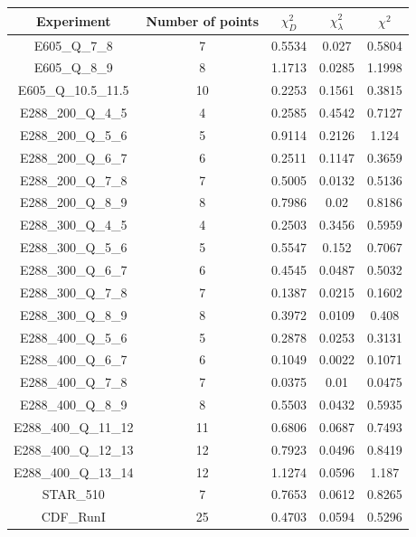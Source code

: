\documentclass[
]{article}
\begin{document}
\begin{table}[h]

\centering

\begin{tabular}{|c|c|c|c|c|} \hline

\textbf{Experiment} & \textbf{Number of
points} & \textbf{\(\chi_{D}^2\)} & \textbf{\(\chi_{\lambda}^2\)} & \textbf{\(\chi^2\)} \\ \hline

E605\_Q\_7\_8 & 7 & 0.5534 & 0.027 & 0.5804 \\ \hline
E605\_Q\_8\_9 & 8 & 1.1713 & 0.0285 & 1.1998 \\ \hline
E605\_Q\_10.5\_11.5 & 10 & 0.2253 & 0.1561 & 0.3815 \\ \hline
E288\_200\_Q\_4\_5 & 4 & 0.2585 & 0.4542 & 0.7127 \\ \hline
E288\_200\_Q\_5\_6 & 5 & 0.9114 & 0.2126 & 1.124 \\ \hline
E288\_200\_Q\_6\_7 & 6 & 0.2511 & 0.1147 & 0.3659 \\ \hline
E288\_200\_Q\_7\_8 & 7 & 0.5005 & 0.0132 & 0.5136 \\ \hline
E288\_200\_Q\_8\_9 & 8 & 0.7986 & 0.02 & 0.8186 \\ \hline
E288\_300\_Q\_4\_5 & 4 & 0.2503 & 0.3456 & 0.5959 \\ \hline
E288\_300\_Q\_5\_6 & 5 & 0.5547 & 0.152 & 0.7067 \\ \hline
E288\_300\_Q\_6\_7 & 6 & 0.4545 & 0.0487 & 0.5032 \\ \hline
E288\_300\_Q\_7\_8 & 7 & 0.1387 & 0.0215 & 0.1602 \\ \hline
E288\_300\_Q\_8\_9 & 8 & 0.3972 & 0.0109 & 0.408 \\ \hline
E288\_400\_Q\_5\_6 & 5 & 0.2878 & 0.0253 & 0.3131 \\ \hline
E288\_400\_Q\_6\_7 & 6 & 0.1049 & 0.0022 & 0.1071 \\ \hline
E288\_400\_Q\_7\_8 & 7 & 0.0375 & 0.01 & 0.0475 \\ \hline
E288\_400\_Q\_8\_9 & 8 & 0.5503 & 0.0432 & 0.5935 \\ \hline
E288\_400\_Q\_11\_12 & 11 & 0.6806 & 0.0687 & 0.7493 \\ \hline
E288\_400\_Q\_12\_13 & 12 & 0.7923 & 0.0496 & 0.8419 \\ \hline
E288\_400\_Q\_13\_14 & 12 & 1.1274 & 0.0596 & 1.187 \\ \hline
STAR\_510 & 7 & 0.7653 & 0.0612 & 0.8265 \\ \hline
CDF\_RunI & 25 & 0.4703 & 0.0594 & 0.5296 \\ \hline

\end{tabular}
\end{table}
\end{document}
